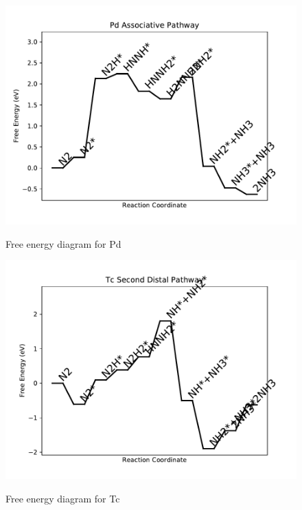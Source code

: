 \documentclass{article}
\begin{document}
\begin{figure}
\includegraphics[width=1\linewidth]{data/plots/Pd_associative.pdf}
\label{fig:Pd_associative}
\caption{Free energy diagram for Pd}
\end{figure}

\clearpage
\begin{figure}
\includegraphics[width=1\linewidth]{data/plots/Tc_distal_2.pdf}
\label{fig:Tc_distal_2}
\caption{Free energy diagram for Tc}
\end{figure}
\end{document}

